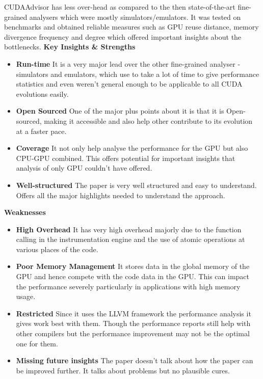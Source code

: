 \documentclass[a4paper]{article}
\begin{document}
CUDAAdvisor has less over-head as compared to the then state-of-the-art fine-grained analysers which were mostly simulators/emulators. It was tested on benchmarks and obtained reliable measures such as GPU reuse distance, memory divergence frequency and degree which offered important insights about the bottlenecks.
\newline
\newline
{\bf\Large Key Insights \& Strengths} \\
\begin{itemize}
\item {\bf Run-time} It is a very major lead over the other fine-grained analyser - simulators and emulators, which use to take a lot of time to give performance statistics and even weren't general enough to be applicable to all CUDA evolutions easily.
\item {\bf Open Sourced} One of the major plus points about it is that it is Open-sourced, making it accessible and also help other contribute to its evolution at a faster pace.
\item {\bf Coverage} It not only help analyse the performance for the GPU but also CPU-GPU combined. This offers potential for important insights that analysis of only GPU couldn't have offered.
\item {\bf Well-structured} The paper is very well structured and easy to understand. Offers all the major highlights needed to understand the approach. 
\end{itemize}
\vspace{1.0cm}
{\bf\Large Weaknesses} \\
\begin{itemize}
\item {\bf High Overhead} It has very high overhead majorly due to the function calling in the instrumentation engine and the use of atomic operations at various places of the code.
\item {\bf Poor Memory Management} It stores data in the global memory of the GPU and hence compete with the code data in the GPU. This can impact the performance severely particularly in applications with high memory usage.
\item {\bf Restricted} Since it uses the LLVM framework the performance analysis it gives work best with them. Though the performance reports still help with other compilers but the performance improvement may not be the optimal one for them.
\item {\bf Missing future insights} The paper doesn't talk about how the paper can be improved further. It talks about problems but no plausible cures.
\end{itemize}
\end{document}
